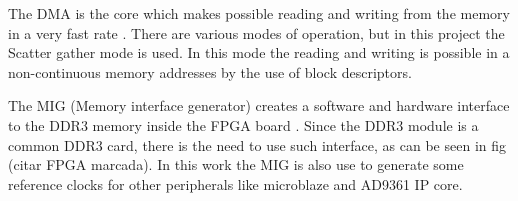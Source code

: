 



The DMA is the core which makes possible reading and writing from the memory
in a very fast rate \cite{xilinx:axidma}. There are various modes of
operation, but in this project the Scatter gather mode is used. In this mode
the reading and writing is possible in a non-continuous memory addresses by
the use of block descriptors.%



The MIG (Memory interface generator) creates a software and hardware interface
to the DDR3 memory inside the FPGA board \cite{xilinx:mig7}. Since the DDR3
module is a common DDR3 card, there is the need to use such interface, as can
be seen in fig (citar FPGA marcada). In this work the MIG is also use to
generate some reference clocks for other peripherals like microblaze and
AD9361 IP core.

